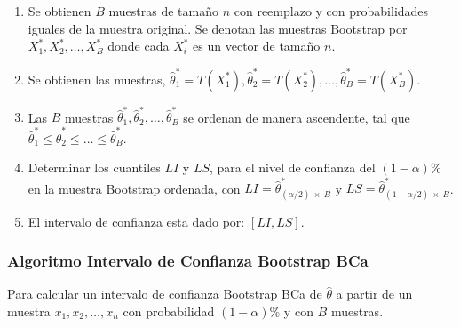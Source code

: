 \begin{enumerate}
\item Se obtienen $B$ muestras de tamaño $n$ con reemplazo y con probabilidades iguales de la muestra original. Se denotan las muestras Bootstrap por $X^{*}_{1}, X^{*}_{2},  \dots, X^{*}_{B}$ donde cada $X^{*}_{i}$ es un vector de tamaño $n$.

\item Se obtienen las muestras, $\hat{\theta}^{*}_{1} = T (X^{*}_{1}) , \hat{\theta}^{*}_{2} = T (X^{*}_{2}), \dots,\hat{\theta}^{*}_{B} = T (X^{*}_{B})$.

\item Las $B$ muestras $\hat{\theta}^{*}_{1}, \hat{\theta}^{*}_{2},\dots, \hat{\theta}^{*}_{B} $ se ordenan de manera ascendente, tal que $\hat{\theta}^{*}_{1} \leq \hat{\theta}^{*}_{2} \leq \dots \leq \hat{\theta}^{*}_{B} $.

\item Determinar los cuantiles $LI$ y $LS$, para el nivel de confianza del $(1-\alpha)$\% en la muestra Bootstrap ordenada, con $LI = \hat{\theta}^{*}_{ ( \alpha/2 ) \: \times \: B} $ y $LS = \hat{\theta}^{*}_{ (1 - \alpha/2) \: \times \: B} $.

\item El intervalo de confianza esta dado por: $[LI, LS]$.
\end{enumerate}





\subsubsection{Algoritmo Intervalo de Confianza Bootstrap BCa}

Para calcular un intervalo de confianza Bootstrap BCa de $\hat{\theta}$ a partir de un muestra $x_{1}, x_{2}, \dots, x_{n}$ con probabilidad $(1-\alpha)$\% y con $B$ muestras.


